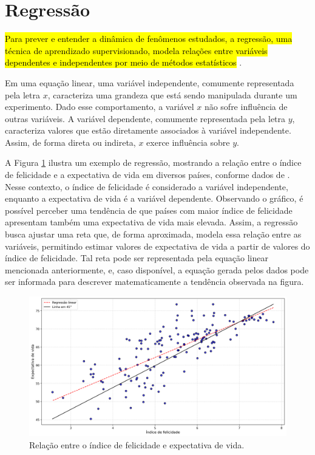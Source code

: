 \section{Regressão}
\label{sec:regressao}

\hl{Para prever e entender a dinâmica de fenômenos estudados, a regressão, uma técnica de aprendizado supervisionado, modela relações entre variáveis dependentes e independentes por meio de métodos estatísticos} \cite{soto2013}.

Em uma equação linear, uma variável independente, comumente representada pela letra $x$, caracteriza uma grandeza que está sendo manipulada durante um experimento. Dado esse comportamento, a variável $x$ não sofre influência de outras variáveis. A variável dependente, comumente representada pela letra $y$, caracteriza valores que estão diretamente associados à variável independente. Assim, de forma direta ou indireta, $x$ exerce influência sobre $y$.

A Figura \ref{fig:regressao_exemplo} ilustra um exemplo de regressão, mostrando a relação entre o índice de felicidade e a expectativa de vida em diversos países, conforme dados de \cite{helliwell2020}. Nesse contexto, o índice de felicidade é considerado a variável independente, enquanto a expectativa de vida é a variável dependente. Observando o gráfico, é possível perceber uma tendência de que países com maior índice de felicidade apresentam também uma expectativa de vida mais elevada. Assim, a regressão busca ajustar uma reta que, de forma aproximada, modela essa relação entre as variáveis, permitindo estimar valores de expectativa de vida a partir de valores do índice de felicidade. Tal reta pode ser representada pela equação linear mencionada anteriormente, e, caso disponível, a equação gerada pelos dados pode ser informada para descrever matematicamente a tendência observada na figura.

\begin{figure}[H]
	\caption{\label{fig:regressao_exemplo}Relação entre o índice de felicidade e expectativa de vida.}
	\begin{center}
		\includegraphics[scale=0.4]{figuras/happiness_world.png}
	\end{center}
\end{figure}

